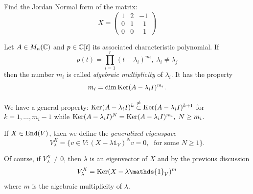 \begin{dang}
    \begin{example}
        Find the Jordan Normal form of the matrix:
        \begin{equation}
         X=\begin{pmatrix}
                1&2&-1\\ 0&1&\;\;1\\ 0&0&\;\;1
            \end{pmatrix}
        \end{equation}
    \end{example}
\end{dang}



\begin{dang}
    \begin{remark}
        Let $A\in M_n(\mathbb{C})$ and $p\in\mathbb{C}[t]$ its associated characteristic polynomial. If
        \begin{equation}
            p(t)=\prod_{i=1}^r(t-\lambda_i)^{m_i},\;\lambda_i\neq\lambda_j
        \end{equation}
        then the number $m_i$ is called \textit{algebraic multiplicity} of $\lambda_i$. It has the property 
        \begin{equation}
            m_i=\dim\text{Ker}(A-\lambda_i I)^{m_i}.
        \end{equation}
    \end{remark}
\end{dang}
We have a general property: $\text{Ker}(A-\lambda_i I)^k\overset{\neq}{\subset}\text{Ker}(A-\lambda_i I)^{k+1}$ for $k=1,\dots,m_i-1$ while 
$\text{Ker}(A-\lambda_i I)^{N}=\text{Ker}(A-\lambda_i I)^{m_i},\;N\geq m_i$. 

\begin{dang}
    \begin{definition}
        If $X\in\text{End}(V)$, then we define the \textit{generalized eigenspace}
        \begin{equation}
            V_\lambda^X=\{v\in V: (X-\lambda\mathds{1}_V)^Nv=0,\;\text{ for some }N\geq1\}.
        \end{equation}
    \end{definition}
\end{dang}
Of course, if $V_\lambda^X\neq0$, then $\lambda$ is an eigenvector of $X$ and by the previous discussion 
\begin{equation}
    V_\lambda^X = \Ker(X-\lambda\mathds{1}_V)^m
\end{equation} 
where $m$ is the algebraic multiplicity of $\lambda$.

